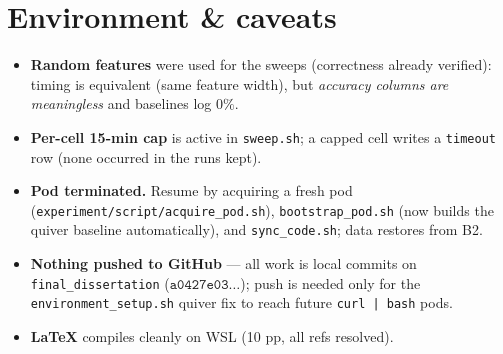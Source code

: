 \section*{Environment \& caveats}
\begin{itemize}
\item \textbf{Random features} were used for the sweeps (correctness already verified):
timing is equivalent (same feature width), but \emph{accuracy columns are meaningless}
and baselines log $0\%$.
\item \textbf{Per-cell 15-min cap} is active in \texttt{sweep.sh}; a capped cell writes a
\texttt{timeout} row (none occurred in the runs kept).
\item \textbf{Pod terminated.} Resume by acquiring a fresh pod
(\texttt{experiment/script/acquire\_pod.sh}), \texttt{bootstrap\_pod.sh} (now builds the
quiver baseline automatically), and \texttt{sync\_code.sh}; data restores from B2.
\item \textbf{Nothing pushed to GitHub} --- all work is local commits on
\texttt{final\_dissertation} ($\texttt{a0427e03}\ldots$); push is needed only for the
\texttt{environment\_setup.sh} quiver fix to reach future \texttt{curl\,|\,bash} pods.
\item \textbf{LaTeX} compiles cleanly on WSL (10 pp, all refs resolved).
\end{itemize}

